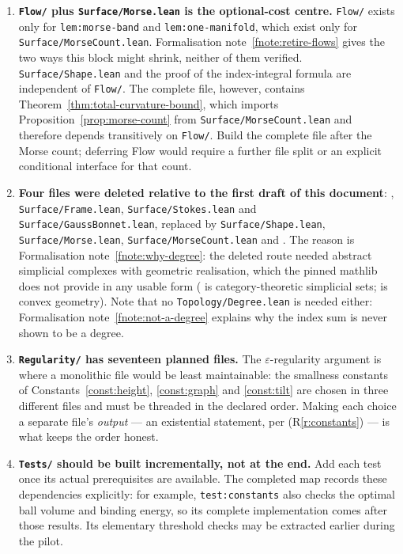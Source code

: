 \begin{enumerate}[leftmargin=*]
\item \textbf{\texttt{Flow/} plus \texttt{Surface/Morse.lean} is the
  optional-cost centre.}  \texttt{Flow/} exists only for
  \texttt{lem:morse-band} and \texttt{lem:one-manifold}, which exist only for
  \texttt{Surface/MorseCount.lean}.  Formalisation
  note~\ref{fnote:retire-flows} gives the two ways this block might shrink,
  neither of them verified.  \texttt{Surface/Shape.lean} and the proof of the
  index-integral formula are independent of \texttt{Flow/}.  The complete
   file, however, contains
  Theorem~\ref{thm:total-curvature-bound}, which imports
  Proposition~\ref{prop:morse-count} from \texttt{Surface/MorseCount.lean}
  and therefore depends transitively on \texttt{Flow/}.  Build the complete
  file after the Morse count; deferring Flow would require a further file
  split or an explicit conditional interface for that count.

\item \textbf{Four files were deleted relative to the first draft of this
  document}: ,
  \texttt{Surface/Frame.lean}, \texttt{Surface/Stokes.lean} and
  \texttt{Surface/GaussBonnet.lean}, replaced by
  \texttt{Surface/Shape.lean}, \texttt{Surface/Morse.lean},
  \texttt{Surface/MorseCount.lean} and
  .  The reason is Formalisation
  note~\ref{fnote:why-degree}: the deleted route needed abstract simplicial
  complexes with geometric realisation, which the pinned mathlib does not
  provide in any usable form ( is
  category-theoretic simplicial sets;
   is convex geometry).  Note that
  no \texttt{Topology/Degree.lean} is needed either: Formalisation
  note~\ref{fnote:not-a-degree} explains why the index sum is never shown to
  be a degree.

\item \textbf{\texttt{Regularity/} has seventeen planned files.}  The
  $\varepsilon$-regularity argument is where a monolithic file would be least
  maintainable: the smallness constants of
  Constants~\ref{const:height}, \ref{const:graph} and \ref{const:tilt} are
  chosen in three different files and must be threaded in the declared order.
  Making each choice a separate file's \emph{output} --- an existential
  statement, per (R\ref{r:constants}) --- is what keeps the order honest.

\item \textbf{\texttt{Tests/} should be built incrementally, not at the end.}
  Add each test once its actual prerequisites are available.  The completed
  map records these dependencies explicitly: for example,
  \texttt{test:constants} also checks the optimal ball volume and binding
  energy, so its complete implementation comes after those results.  Its
  elementary threshold checks may be extracted earlier during the pilot.


\end{enumerate}

